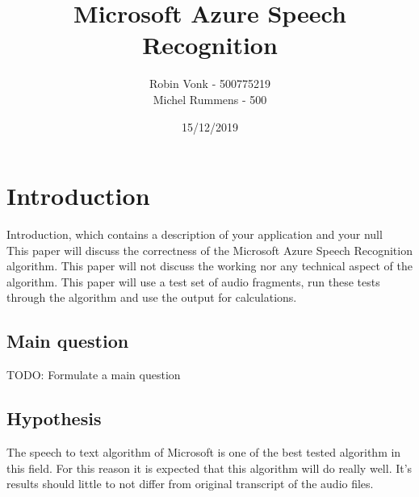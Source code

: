 \documentclass{article}
\begin{document}
\title{Microsoft Azure Speech Recognition}
\author{Robin Vonk - 500775219 \\
		Michel Rummens - 500 \\}
\date{15/12/2019}

\setlength{\columnsep}{30px}


\tableofcontents
\section{Introduction}
Introduction, which contains a description of your application and your null \\
This paper will discuss the correctness of the Microsoft Azure Speech Recognition algorithm. This paper will not discuss the working nor any technical aspect of the algorithm. This paper will use a test set of audio fragments, run these tests through the algorithm and use the output for calculations.



\subsection{Main question}
TODO: Formulate a main question

\subsection{Hypothesis}
The speech to text algorithm of Microsoft is one of the best tested algorithm in this field\cite{Veton}. For this reason it is expected that this algorithm will do really well. It's results should little to not differ from original transcript of the audio files. 
\end{document}

